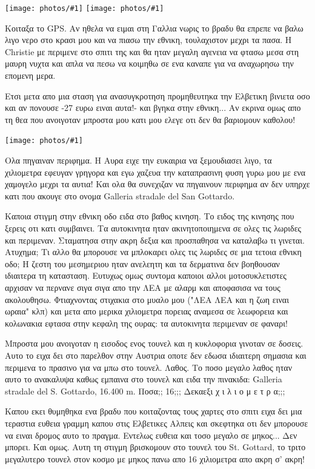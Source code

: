 \documentclass[11pt, letterpaper]{book}
\newcommand\photo[1]{\noindent\texttt{[image: photos/\#1]}}
\begin{document}
\photo{35.jpg}
\photo{36.jpg}

Κοιταξα το GPS. Αν ηθελα να ειμαι στη Γαλλια νωρις το βραδυ θα επρεπε να βαλω λιγο νερο στο κρασι μου και να πιασω την εθνικη, τουλαχιστον μεχρι τα πασα. Η Christie με περιμενε στο σπιτι της και θα ηταν μεγαλη αγενεια να φτασω μεσα στη μαυρη νυχτα και απλα να πεσω να κοιμηθω σε ενα καναπε για να αναχωρησω την επομενη μερα.

Ετσι μετα απο μια σταση για ανασυγκροτηση προμηθευτηκα την Ελβετικη βινιετα οσο και αν πονουσε -27 ευρω ειναι αυτα!- και βγηκα στην εθνικη...
Αν εκρινα ομως απο τη θεα που ανοιγοταν μπροστα μου κατι μου ελεγε οτι δεν θα βαριομουν καθολου!

\photo{37.jpg}

Ολα πηγαιναν περιφημα. Η Αυρα ειχε την ευκαιρια να ξεμουδιασει λιγο, τα χιλιομετρα εφευγαν γρηγορα και εγω χαζευα την καταπρασινη φυση γυρω μου με ενα χαμογελο μεχρι τα αυτια! Και ολα θα συνεχιζαν να πηγαινουν περιφημα αν δεν υπηρχε κατι που ακουγε στο ονομα Galleria stradale del San Gottardo. 

Καποια στιγμη στην εθνικη οδο ειδα στο βαθος κινηση. Το ειδος της κινησης που ξερεις οτι κατι συμβαινει. Τα αυτοκινητα ηταν ακινητοποιημενα σε ολες τις λωριδες και περιμεναν. Σταματησα στην ακρη δεξια και προσπαθησα να καταλαβω τι γινεται. Ατυχημα; 
Τι αλλο θα μπορουσε να μπλοκαρει ολες τις λωριδες σε μια τετοια εθνικη οδο; Η ζεστη του μεσημεριου ηταν ανελεητη και τα δερματινα δεν βοηθουσαν ιδιαιτερα τη κατασταση. 
Ευτυχως ομως συντομα καποιοι αλλοι μοτοσυκλετιστες αρχισαν να περνανε σιγα σιγα απο την ΛΕΑ με αλαρμ και αποφασισα να τους ακολουθησω. Φτιαχνοντας στιχακια στο μυαλο μου ("ΛΕΑ ΛΕΑ και η ζωη ειναι ωραια" κλπ) και μετα απο μερικα χιλιομετρα πορειας αναμεσα σε λεωφορεια και κολωνακια εφτασα στην κεφαλη της ουρας: τα αυτοκινητα περιμεναν σε φαναρι! 

Μπροστα μου ανοιγοταν η εισοδος ενος τουνελ και η κυκλοφορια γινοταν σε δοσεις. Αυτο το ειχα δει στο παρελθον στην Αυστρια οποτε δεν εδωσα ιδιαιτερη σημασια και περιμενα το πρασινο για να μπω στο τουνελ. Λαθος.
Το ποσο μεγαλο λαθος ηταν αυτο το ανακαλυψα καθως εμπαινα στο τουνελ και ειδα την πινακιδα: Galleria stradale del S. Gottardo, 16.400 m. Ποσα;; 16;;; Δεκαεξι χ ι λ ι ο μ ε τ ρ α;;;

Καπου εκει θυμηθηκα ενα βραδυ που κοιταζοντας τους χαρτες στο σπιτι ειχα δει μια τεραστια ευθεια γραμμη καπου στις Ελβετικες Αλπεις και σκεφτηκα οτι δεν μπορουσε να ειναι δρομος αυτο το πραγμα. Εντελως ευθεια και τοσο μεγαλο σε μηκος... Δεν μπορει. 
Και ομως. Αυτη τη στιγμη βρισκομουν στο τουνελ του St. Gottard, το τριτο μεγαλυτερο τουνελ στον κοσμο με μηκος πανω απο 16 χιλιομετρα απο ακρη σ' ακρη!
\end{document}
